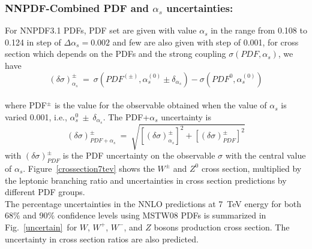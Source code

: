 \subsubsection{NNPDF-Combined PDF and $\alpha_{s}$ uncertainties:}
For NNPDF3.1 PDFs, PDF set are given with value $\alpha_{s}$ in the range from 0.108 to 0.124 in step of $\Delta\alpha_{s}=0.002$ and few are also given with step of 0.001, for cross section which depends on the PDFs and the strong coupling  $\sigma(PDF, \alpha_{s})$, we have\\
\begin{equation}
(\delta\sigma)_{\alpha_{s}}^{\pm}~=~\sigma(PDF^{(\pm)},\alpha_{s}^{(0)}\pm\delta_{\alpha_{s}})-\sigma(PDF^{0},\alpha_{s}^{(0)})
\end{equation}\\
where PDF$^{\pm}$ is the value for the observable obtained when the value of  $\alpha_{s}$ is varied 0.001, i.e., $\alpha_{s}^{0}~\pm~\delta_{\alpha_{s}}$. The PDF+$\alpha_{s}$ uncertainty is\\
\begin{equation}
(\delta\sigma)_{PDF+\alpha_{s}}^{\pm}~=~\sqrt{[(\delta\sigma)_{\alpha_{s}}^{\pm}]^{2}+[(\delta\sigma)_{PDF}^{\pm}]^{2}}
\end{equation}
with $(\delta\sigma)_{PDF}^{\pm}$ is the PDF uncertainty on the observable $\sigma$ with the central value of $\alpha_{s}$. Figure~\ref{crossection7tev} shows the $W^{\pm}$ and $Z^{0}$ cross section, multiplied by the leptonic branching ratio and uncertainties in cross section predictions by different PDF groups.\\
The percentage uncertainties in the NNLO predictions at 7~TeV energy for both 68$\%$ and 90$\%$ confidence levels using MSTW08 PDFs is summarized in Fig.~\ref{uncertain}~for $W$, $W^{+}$, $W^{-}$, and $Z$ bosons production cross section. The uncertainty in cross section ratios are also predicted.

